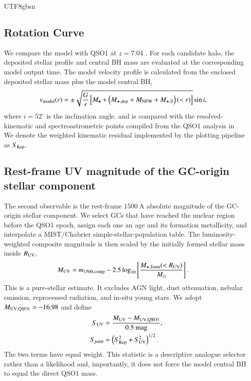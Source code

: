 \documentclass[trackchanges, twocolappendix, twocolumn]{aastex701}
\begin{document}
\begin{CJK*}{UTF8}{gbsn}
\subsection{Rotation Curve} \label{subsect:rot_curve}

We compare the model with QSO1 at $z = 7.04$ \citep{Furtak+2023A2744-QSO1, Furtak+2024A2744-QSO1, DEugenio+2026A2744-QSO1}. For each candidate halo, the deposited stellar profile and central BH mass are evaluated at the corresponding model output time. The model velocity profile is calculated from the enclosed deposited stellar mass plus the model central BH,
\begin{align}
v_{\rm model} (r) & = \pm \sqrt{\dfrac{G}{r} \left[ M_\bullet + \left( M_{\star, \rm dep} + M_{\rm NFW} + M_{\star, \rm S} \right) (< r) \right]} \sin i ,
\label{eq:v_model}
\end{align}
where $i = 52^\circ$ is the inclination angle. and is compared with the resolved-kinematic and spectroastrometric points
compiled from the QSO1 analysis in \cite{Juodzbalis+2026SMBH}. We denote the weighted kinematic residual implemented by the plotting pipeline as $S_{\rm Kep}$.

\subsection{Rest-frame UV magnitude of the GC-origin stellar component} \label{subsect:UVmag}

The second observable is the rest-frame $1500~\mathring{\mathrm{A}}$ absolute magnitude of the
GC-origin stellar component. We select GCs that have reached the nuclear
region before the QSO1 epoch, assign each one an age and its formation
metallicity, and interpolate a MIST/Chabrier simple-stellar-population table.
The luminosity-weighted composite magnitude is then scaled by the initially
formed stellar mass inside $R_{\rm UV}$,
\begin{align}
M_{\rm UV}
&=m_{1500,{\rm comp}}
-2.5\log_{10}\left[\frac{M_{\star,{\rm form}}(<R_{\rm UV})}{M_\odot}\right].
\label{eq:muv}
\end{align}
This is a pure-stellar estimate. It excludes AGN light, dust attenuation,
nebular emission, reprocessed radiation, and in-situ young stars. We adopt
$M_{\rm UV, QSO1} = -16.98$ and define
\begin{align}
S_{\rm UV}
&=\frac{M_{\rm UV}-M_{{\rm UV},{\rm QSO1}}}{0.5~{\rm mag}},
\\
S_{\rm joint}
&=\left(S_{\rm Kep}^2+S_{\rm UV}^2\right)^{1/2}.
\label{eq:qso1_score}
\end{align}
The two terms have equal weight. This statistic is a descriptive analogue
selector rather than a likelihood and, importantly, it does not force the
model central BH to equal the direct QSO1 mass.


\end{CJK*}
\end{document}
